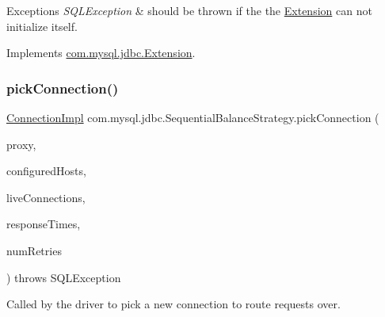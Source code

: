 \begin{DoxyExceptions}{Exceptions}
{\em S\+Q\+L\+Exception} & should be thrown if the the \mbox{\hyperlink{interfacecom_1_1mysql_1_1jdbc_1_1_extension}{Extension}} can not initialize itself. \\
\hline
\end{DoxyExceptions}


Implements \mbox{\hyperlink{interfacecom_1_1mysql_1_1jdbc_1_1_extension_a79427811058193260bd4df0c38414e88}{com.\+mysql.\+jdbc.\+Extension}}.

\mbox{\label{classcom_1_1mysql_1_1jdbc_1_1_sequential_balance_strategy_a382180c797efcc912292dc511beafa4d}} 
\subsubsection{\texorpdfstring{pick\+Connection()}{pickConnection()}}
{\footnotesize\ttfamily \mbox{\hyperlink{classcom_1_1mysql_1_1jdbc_1_1_connection_impl}{Connection\+Impl}} com.\+mysql.\+jdbc.\+Sequential\+Balance\+Strategy.\+pick\+Connection (\begin{DoxyParamCaption}\item[{\mbox{\hyperlink{classcom_1_1mysql_1_1jdbc_1_1_load_balanced_connection_proxy}{Load\+Balanced\+Connection\+Proxy}}}]{proxy,  }\item[{List$<$ String $>$}]{configured\+Hosts,  }\item[{Map$<$ String, \mbox{\hyperlink{classcom_1_1mysql_1_1jdbc_1_1_connection_impl}{Connection\+Impl}} $>$}]{live\+Connections,  }\item[{long \mbox{[}$\,$\mbox{]}}]{response\+Times,  }\item[{int}]{num\+Retries }\end{DoxyParamCaption}) throws S\+Q\+L\+Exception}

Called by the driver to pick a new connection to route requests over.


